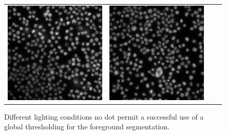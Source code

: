 \begin{figure}[H]
\begin{tabularx}{\textwidth}{YYYY}
            \includegraphics{bilder/lightning-conditions/lightning-3.png} &
            \includegraphics{bilder/lightning-conditions/lightning-4.png}
        \end{tabularx}
    \caption[Different lighting conditions]%
    {Different lighting conditions no dot permit a successful use of a global thresholding for the foreground segmentation.}
    \label{fig:lightning_conditions}
\end{figure}

